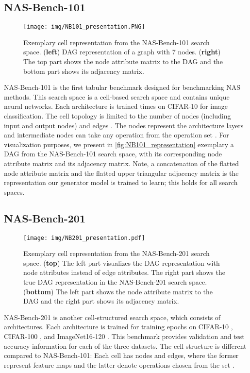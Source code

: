 \documentclass[runningheads]{llncs}
\begin{document}
\subsection{NAS-Bench-101}

\begin{figure*}
	\centering
	\texttt{[image: img/NB101\_presentation.PNG]}
	
	\caption{Exemplary cell representation from the NAS-Bench-101 search space. (\textbf{left}) DAG representation of a graph with 7 nodes. (\textbf{right}) The top part shows the node attribute matrix to the DAG and the bottom part shows its adjacency matrix. \label{fig:NB101_representation}}
	
\end{figure*}
NAS-Bench-101 is the first tabular benchmark designed for benchmarking NAS methods.
This search space is a cell-based search space and contains  unique neural networks.
Each architecture is trained  times on CIFAR-10 \cite{2009CIFAR} for image classification.
The cell topology is limited to the number of nodes  (including input and output nodes) and edges .
The nodes represent the architecture layers and intermediate nodes can take any operation from the operation set .
For visualization purposes, we present in \autoref{fig:NB101_representation} exemplary a DAG from the NAS-Bench-101 search space, with its corresponding node attribute matrix and its adjacency matrix. Note, a concatenation of the flatted node attribute matrix and the flatted upper triangular adjacency matrix is the representation our generator model is trained to learn; this holds for all search spaces.


\subsection{NAS-Bench-201}
\begin{figure*}
	\centering
	\texttt{[image: img/NB201\_presentation.pdf]}
	\caption{Exemplary cell representation from the NAS-Bench-201 search space. (\textbf{top}) The left part visualizes the DAG representation with node attributes instead of edge attributes. The right part shows the true DAG representation in the NAS-Bench-201 search space. (\textbf{bottom}) The left part shows the node attribute matrix to the DAG and the right part shows its adjacency matrix. \label{fig:NB201_representation}}
\end{figure*}

NAS-Bench-201 \cite{2020NB201} is another 
cell-structured search space, which consists of  architectures.
Each architecture is trained for  training epochs
on CIFAR-10 \cite{2009CIFAR}, CIFAR-100 \cite{2009CIFAR}, and ImageNet16-120 \cite{2017ImageNet16}.
This benchmark provides validation and test accuracy information for each of the three datasets.
The cell structure is different compared to NAS-Bench-101: Each cell has  nodes and  edges, where the former represent
feature maps and the latter denote operations chosen from the set .
\end{document}
